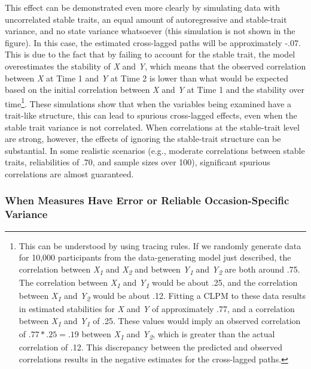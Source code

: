 \documentclass[
  english,
  man,floatsintext]{apa6}
\begin{document}
This effect can be demonstrated even more clearly by simulating data with uncorrelated stable traits, an equal amount of autoregressive and stable-trait variance, and no state variance whatsoever (this simulation is not shown in the figure). In this case, the estimated cross-lagged paths will be approximately -.07. This is due to the fact that by failing to account for the stable trait, the model overestimates the stability of \emph{X} and \emph{Y}, which means that the observed correlation between \emph{X} at Time 1 and \emph{Y} at Time 2 is lower than what would be expected based on the initial correlation between \emph{X} and \emph{Y} at Time 1 and the stability over time\footnote{This can be understood by using tracing rules. If we randomly generate data for 10,000 participants from the data-generating model just described, the correlation between \emph{X\textsubscript{1}} and \emph{X\textsubscript{2}} and between \emph{Y\textsubscript{1}} and \emph{Y\textsubscript{2}} are both around .75. The correlation between \emph{X\textsubscript{1}} and \emph{Y\textsubscript{1}} would be about .25, and the correlation between \emph{X\textsubscript{1}} and \emph{Y\textsubscript{2}} would be about .12. Fitting a CLPM to these data results in estimated stabilities for \emph{X} and \emph{Y} of approximately .77, and a correlation between \emph{X\textsubscript{1}} and \emph{Y\textsubscript{1}} of .25. These values would imply an observed correlation of \(.77 * .25 = .19\) between \emph{X\textsubscript{1}} and \emph{Y\textsubscript{2}}, which is greater than the actual correlation of .12. This discrepancy between the predicted and observed correlations results in the negative estimates for the cross-lagged paths.}. These simulations show that when the variables being examined have a trait-like structure, this can lead to spurious cross-lagged effects, even when the stable trait variance is not correlated. When correlations at the stable-trait level are strong, however, the effects of ignoring the stable-trait structure can be substantial. In some realistic scenarios (e.g., moderate correlations between stable traits, reliabilities of .70, and sample sizes over 100), significant spurious correlations are almost guaranteed.

\hypertarget{when-measures-have-error-or-reliable-occasion-specific-variance}{%
\subsubsection{When Measures Have Error or Reliable Occasion-Specific Variance}\label{when-measures-have-error-or-reliable-occasion-specific-variance}}
\end{document}
